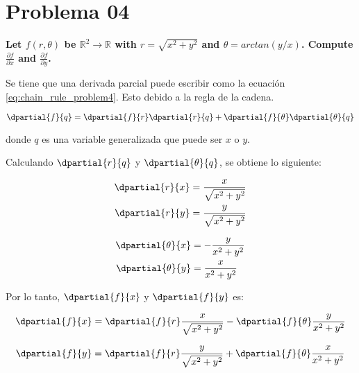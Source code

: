 \section*{Problema 04}

\textbf{Let $f(r,\theta)$ be $\mathbb{R}^2 \rightarrow \mathbb{R}$ with $r=\sqrt{x^2+y^2}$ and $\theta = arctan(y/x)$. Compute $\frac{\partial f}{\partial x}$ and $\frac{\partial f}{\partial y}$.}


Se tiene que una derivada parcial puede escribir como la ecuación \ref{eq:chain_rule_problem4}. Esto debido a la regla de la cadena.

\begin{equation}
    \dpartial{f}{q} = \dpartial{f}{r}\dpartial{r}{q} + \dpartial{f}{\theta}\dpartial{\theta}{q} \label{eq:chain_rule_problem4}
\end{equation}

donde $q$ es una variable generalizada que puede ser $x$ o $y$.

Calculando $\dpartial{r}{q}$ y $\dpartial{\theta}{q}$, se obtiene lo siguiente:

\begin{minipage}{0.45\linewidth}
    \begin{align*}
        \dpartial{r}{x} & = \frac{x}{\sqrt{x^2+y^2}} \\
        \dpartial{r}{y} & = \frac{y}{\sqrt{x^2+y^2}}
    \end{align*}
\end{minipage}
\begin{minipage}{0.45\linewidth}
    \begin{align*}
        \dpartial{\theta}{x} & = -\frac{y}{x^2+y^2} \\
        \dpartial{\theta}{y} & = \frac{x}{ x^2+y^2}
    \end{align*}
\end{minipage}

Por lo tanto, $\dpartial{f}{x}$ y $\dpartial{f}{y}$ es:

\begin{equation*}
    \dpartial{f}{x} = \dpartial{f}{r}\frac{x}{\sqrt{x^2+y^2}} - \dpartial{f}{\theta} \frac{y}{x^2+y^2}
\end{equation*}


\begin{equation*}
    \dpartial{f}{y} = \dpartial{f}{r}\frac{y}{\sqrt{x^2+y^2}} + \dpartial{f}{\theta} \frac{x}{x^2+y^2}
\end{equation*}